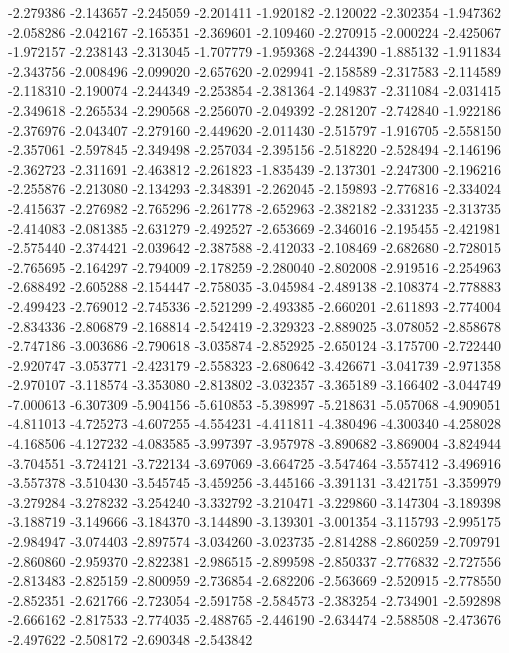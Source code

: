 -2.279386
-2.143657
-2.245059
-2.201411
-1.920182
-2.120022
-2.302354
-1.947362
-2.058286
-2.042167
-2.165351
-2.369601
-2.109460
-2.270915
-2.000224
-2.425067
-1.972157
-2.238143
-2.313045
-1.707779
-1.959368
-2.244390
-1.885132
-1.911834
-2.343756
-2.008496
-2.099020
-2.657620
-2.029941
-2.158589
-2.317583
-2.114589
-2.118310
-2.190074
-2.244349
-2.253854
-2.381364
-2.149837
-2.311084
-2.031415
-2.349618
-2.265534
-2.290568
-2.256070
-2.049392
-2.281207
-2.742840
-1.922186
-2.376976
-2.043407
-2.279160
-2.449620
-2.011430
-2.515797
-1.916705
-2.558150
-2.357061
-2.597845
-2.349498
-2.257034
-2.395156
-2.518220
-2.528494
-2.146196
-2.362723
-2.311691
-2.463812
-2.261823
-1.835439
-2.137301
-2.247300
-2.196216
-2.255876
-2.213080
-2.134293
-2.348391
-2.262045
-2.159893
-2.776816
-2.334024
-2.415637
-2.276982
-2.765296
-2.261778
-2.652963
-2.382182
-2.331235
-2.313735
-2.414083
-2.081385
-2.631279
-2.492527
-2.653669
-2.346016
-2.195455
-2.421981
-2.575440
-2.374421
-2.039642
-2.387588
-2.412033
-2.108469
-2.682680
-2.728015
-2.765695
-2.164297
-2.794009
-2.178259
-2.280040
-2.802008
-2.919516
-2.254963
-2.688492
-2.605288
-2.154447
-2.758035
-3.045984
-2.489138
-2.108374
-2.778883
-2.499423
-2.769012
-2.745336
-2.521299
-2.493385
-2.660201
-2.611893
-2.774004
-2.834336
-2.806879
-2.168814
-2.542419
-2.329323
-2.889025
-3.078052
-2.858678
-2.747186
-3.003686
-2.790618
-3.035874
-2.852925
-2.650124
-3.175700
-2.722440
-2.920747
-3.053771
-2.423179
-2.558323
-2.680642
-3.426671
-3.041739
-2.971358
-2.970107
-3.118574
-3.353080
-2.813802
-3.032357
-3.365189
-3.166402
-3.044749
-7.000613
-6.307309
-5.904156
-5.610853
-5.398997
-5.218631
-5.057068
-4.909051
-4.811013
-4.725273
-4.607255
-4.554231
-4.411811
-4.380496
-4.300340
-4.258028
-4.168506
-4.127232
-4.083585
-3.997397
-3.957978
-3.890682
-3.869004
-3.824944
-3.704551
-3.724121
-3.722134
-3.697069
-3.664725
-3.547464
-3.557412
-3.496916
-3.557378
-3.510430
-3.545745
-3.459256
-3.445166
-3.391131
-3.421751
-3.359979
-3.279284
-3.278232
-3.254240
-3.332792
-3.210471
-3.229860
-3.147304
-3.189398
-3.188719
-3.149666
-3.184370
-3.144890
-3.139301
-3.001354
-3.115793
-2.995175
-2.984947
-3.074403
-2.897574
-3.034260
-3.023735
-2.814288
-2.860259
-2.709791
-2.860860
-2.959370
-2.822381
-2.986515
-2.899598
-2.850337
-2.776832
-2.727556
-2.813483
-2.825159
-2.800959
-2.736854
-2.682206
-2.563669
-2.520915
-2.778550
-2.852351
-2.621766
-2.723054
-2.591758
-2.584573
-2.383254
-2.734901
-2.592898
-2.666162
-2.817533
-2.774035
-2.488765
-2.446190
-2.634474
-2.588508
-2.473676
-2.497622
-2.508172
-2.690348
-2.543842

